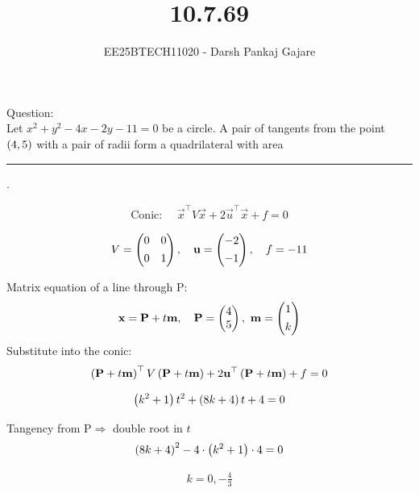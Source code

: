 \documentclass{beamer}
\let\solution\relax
\numberwithin{equation}{section}
\begin{document}
\title{10.7.69}
\author{EE25BTECH11020 - Darsh Pankaj Gajare}
{\let\newpage\relax\maketitle}



Question:\\

Let $x^2+y^2-4x-2y-11=0$ be a circle. A pair of tangents from the point $\left(4,5\right)$ with a pair of radii form a quadrilateral with area\rule{1cm}{0.4pt}.


\solution
\begin{align}
\text{Conic: }\quad \vec{x}^\top V\vec{x}+2\vec{u}^\top\vec{x}+f=0
\end{align}

\begin{align}
V=\begin{pmatrix}0 & 0\\[4pt]0 & 1\end{pmatrix},\quad \mathbf{u}=\begin{pmatrix}-2\\[4pt]-1\end{pmatrix},\quad f=-11
\end{align}

Matrix equation of a line through P: 
\begin{align}
\vec{x}=\vec{P}+t\vec{m},\quad \vec{P}=\myvec{4\\5},\ \vec{m}=\myvec{1\\[4pt]k}
\end{align}
Substitute into the conic:
\begin{align}
	\left(\mathbf{P}+t\mathbf{m}\right)^\top V\left(\mathbf{P}+t\mathbf{m}\right)+2\mathbf{u}^\top\left(\mathbf{P}+t\mathbf{m}\right)+f=0
\end{align}

\begin{align}
	\left(k^2+1\right)t^2+\left(8k+4\right)t+4=0
\end{align}

Tangency from P$\Rightarrow$ double root in $t$
\begin{align}
	\left(8k+4\right)^2-4\cdot\left(k^2+1\right)\cdot 4=0
\end{align}

\begin{align}
 k=0,-\frac{4}{3}
\end{align}
\end{document}
